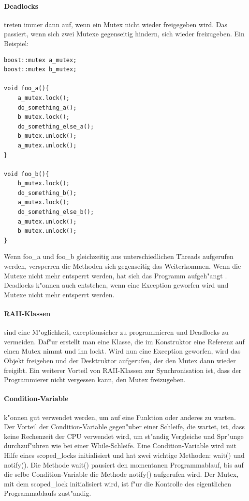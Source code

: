 \documentclass[14pt, a4paper]{report}
\begin{document}
\paragraph{Deadlocks} treten immer dann auf, wenn ein Mutex nicht wieder freigegeben 
wird. Das passiert, wenn sich zwei Mutexe gegenseitig hindern, sich wieder 
freizugeben. Ein Beispiel:
\begin{lstlisting}
boost::mutex a_mutex;
boost::mutex b_mutex;

void foo_a(){
	a_mutex.lock();
	do_something_a();
	b_mutex.lock();
	do_something_else_a();
	b_mutex.unlock();
	a_mutex.unlock();
}

void foo_b(){
	b_mutex.lock();
	do_something_b();
	a_mutex.lock();
	do_something_else_b();
	a_mutex.unlock();
	b_mutex.unlock();
}
\end{lstlisting}
Wenn foo\_a und foo\_b gleichzeitig aus unterschiedlichen Threads aufgerufen werden, 
versperren die Methoden sich gegenseitig das Weiterkommen. Wenn die Mutexe nicht mehr
entsperrt werden, hat sich das Programm
\glqq aufgeh"angt \grqq. Deadlocks k"onnen auch entstehen, wenn eine Exception geworfen wird und
Mutexe nicht mehr entsperrt werden.

\paragraph{RAII-Klassen} sind eine M"oglichkeit, exceptionsicher zu programmieren und 
Deadlocks zu vermeiden. Daf"ur erstellt man eine Klasse, die im Konstruktor eine 
Referenz auf einen Mutex nimmt und ihn lockt. Wird nun eine Exception geworfen, wird
das Objekt freigeben und der Desktruktor aufgerufen, der den Mutex dann wieder freigibt.
Ein weiterer Vorteil von RAII-Klassen zur Synchronisation ist, dass der Programmierer 
nicht vergessen kann, den Mutex freizugeben.

\paragraph{Condition-Variable} k"onnen gut verwendet werden, um auf eine Funktion
oder anderes zu warten. Der Vorteil der Condition-Variable gegen"uber einer Schleife,
die wartet, ist, dass keine Rechenzeit der CPU verwendet wird, um st"andig Vergleiche und
Spr"unge durchzuf"uhren wie bei einer While-Schleife. 
Eine Condition-Variable wird mit Hilfe eines scoped\_locks
initialisiert und hat zwei wichtige Methoden: wait() und notify(). Die Methode wait() 
pausiert den momentanen Programmablauf, bis auf die selbe Condition-Variable die Methode
notify() aufgerufen wird. Der Mutex, mit dem scoped\_lock initialisiert wird, ist f"ur die
Kontrolle des eigentlichen Programmablaufs zust"andig.
\end{document}
